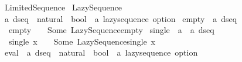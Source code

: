 %
\begin{isabellebody}%
%
%
\isadelimdocument
%
\endisadelimdocument
%
\isatagdocument
%
\isamarkuptrue%
%
\endisatagdocument
{\isafolddocument}%
%
\isadelimdocument
%
\endisadelimdocument
%
\isadelimtheory
%
\endisadelimtheory
%
\isatagtheory
{}\isamarkupfalse%
\ Limited{\isacharunderscore}{\kern0pt}Sequence\isanewline
{}\ Lazy{\isacharunderscore}{\kern0pt}Sequence\isanewline
{}%
\endisatagtheory
{\isafoldtheory}%
%
\isadelimtheory
%
\endisadelimtheory
%
\isadelimdocument
%
\endisadelimdocument
%
\isatagdocument
%
\isamarkuptrue%
%
\endisatagdocument
{\isafolddocument}%
%
\isadelimdocument
%
\endisadelimdocument
{}\isamarkupfalse%
\ {\isacharprime}{\kern0pt}a\ dseq\ {\isacharequal}{\kern0pt}\ {\isachardoublequoteopen}natural\ {\isasymRightarrow}\ bool\ {\isasymRightarrow}\ {\isacharprime}{\kern0pt}a\ lazy{\isacharunderscore}{\kern0pt}sequence\ option{\isachardoublequoteclose}\isanewline
\isanewline
{}\isamarkupfalse%
\ empty\ {\isacharcolon}{\kern0pt}{\isacharcolon}{\kern0pt}\ {\isachardoublequoteopen}{\isacharprime}{\kern0pt}a\ dseq{\isachardoublequoteclose}\isanewline
{}\isanewline
\ \ {\isachardoublequoteopen}empty\ {\isacharequal}{\kern0pt}\ {\isacharparenleft}{\kern0pt}{\isasymlambda}{\isacharunderscore}{\kern0pt}\ {\isacharunderscore}{\kern0pt}{\isachardot}{\kern0pt}\ Some\ Lazy{\isacharunderscore}{\kern0pt}Sequence{\isachardot}{\kern0pt}empty{\isacharparenright}{\kern0pt}{\isachardoublequoteclose}\isanewline
\isanewline
{}\isamarkupfalse%
\ single\ {\isacharcolon}{\kern0pt}{\isacharcolon}{\kern0pt}\ {\isachardoublequoteopen}{\isacharprime}{\kern0pt}a\ {\isasymRightarrow}\ {\isacharprime}{\kern0pt}a\ dseq{\isachardoublequoteclose}\isanewline
{}\isanewline
\ \ {\isachardoublequoteopen}single\ x\ {\isacharequal}{\kern0pt}\ {\isacharparenleft}{\kern0pt}{\isasymlambda}{\isacharunderscore}{\kern0pt}\ {\isacharunderscore}{\kern0pt}{\isachardot}{\kern0pt}\ Some\ {\isacharparenleft}{\kern0pt}Lazy{\isacharunderscore}{\kern0pt}Sequence{\isachardot}{\kern0pt}single\ x{\isacharparenright}{\kern0pt}{\isacharparenright}{\kern0pt}{\isachardoublequoteclose}\isanewline
\isanewline
{}\isamarkupfalse%
\ eval\ {\isacharcolon}{\kern0pt}{\isacharcolon}{\kern0pt}\ {\isachardoublequoteopen}{\isacharprime}{\kern0pt}a\ dseq\ {\isasymRightarrow}\ natural\ {\isasymRightarrow}\ bool\ {\isasymRightarrow}\ {\isacharprime}{\kern0pt}a\ lazy{\isacharunderscore}{\kern0pt}sequence\ option{\isachardoublequoteclose}\isanewline

\end{isabellebody}
